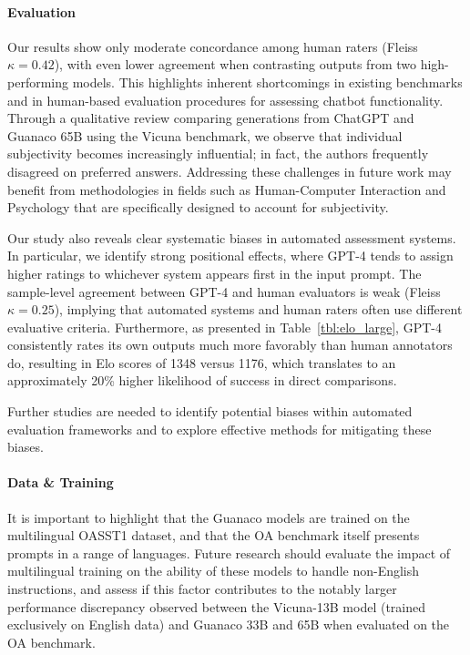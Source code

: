 \paragraph{Evaluation}

Our results show only moderate concordance among human raters (Fleiss $\kappa=0.42$), with even lower agreement when contrasting outputs from two high-performing models. This highlights inherent shortcomings in existing benchmarks and in human-based evaluation procedures for assessing chatbot functionality. Through a qualitative review comparing generations from ChatGPT and {Guanaco} 65B using the Vicuna benchmark, we observe that individual subjectivity becomes increasingly influential; in fact, the authors frequently disagreed on preferred answers. Addressing these challenges in future work may benefit from methodologies in fields such as Human-Computer Interaction and Psychology that are specifically designed to account for subjectivity.

Our study also reveals clear systematic biases in automated assessment systems. In particular, we identify strong positional effects, where GPT-4 tends to assign higher ratings to whichever system appears first in the input prompt. The sample-level agreement between GPT-4 and human evaluators is weak (Fleiss $\kappa=0.25$), implying that automated systems and human raters often use different evaluative criteria. Furthermore, as presented in Table~\ref{tbl:elo_large}, GPT-4 consistently rates its own outputs much more favorably than human annotators do, resulting in Elo scores of 1348 versus 1176, which translates to an approximately 20\% higher likelihood of success in direct comparisons.

Further studies are needed to identify potential biases within automated evaluation frameworks and to explore effective methods for mitigating these biases.

\paragraph{Data \& Training} It is important to highlight that the {Guanaco} models are trained on the multilingual OASST1 dataset, and that the OA benchmark itself presents prompts in a range of languages. Future research should evaluate the impact of multilingual training on the ability of these models to handle non-English instructions, and assess if this factor contributes to the notably larger performance discrepancy observed between the Vicuna-13B model (trained exclusively on English data) and {Guanaco} 33B and 65B when evaluated on the OA benchmark.

